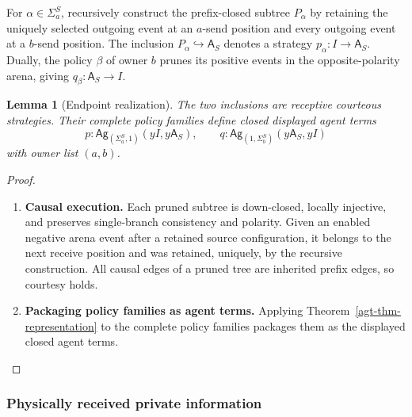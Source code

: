 \documentclass[11pt,a4paper]{article}
\numberwithin{equation}{section}
\newtheorem{lemma}[theorem]{Lemma}
\theoremstyle{definition}
\theoremstyle{remark}
\theoremstyle{plain}
\providecommand{\Ag}{\mathsf{Ag}}
\begin{document}
For $\alpha\in\Sigma_a^S$, recursively construct the prefix-closed
subtree $P_\alpha$ by retaining the uniquely selected outgoing event at
an $a$-send position and every outgoing event at a $b$-send position.
The inclusion $P_\alpha\hookrightarrow\mathsf A_S$ denotes a strategy
$p_\alpha:I\to\mathsf A_S$.  Dually, the policy $\beta$ of owner $b$
prunes its positive events in the opposite-polarity arena, giving
$q_\beta:\mathsf A_S\to I$.

\begin{lemma}[Endpoint realization]
\label{agt-lem-endpoint}
The two inclusions are receptive courteous strategies. Their complete
policy families define closed displayed agent terms
\[
 p:\Ag_{(\Sigma_a^S,1)}(yI,y\mathsf A_S),\qquad
 q:\Ag_{(1,\Sigma_b^S)}(y\mathsf A_S,yI)
\]
with owner list $(a,b)$.
\end{lemma}
\begin{proof}
\leavevmode
\begin{enumerate}[label=\textup{(\arabic*)},leftmargin=*,itemsep=4pt,topsep=3pt]
  \item \textbf{Causal execution.} Each pruned subtree is down-closed, locally injective, and preserves
single-branch consistency and polarity. Given an enabled negative
arena event after a retained source configuration, it belongs to the
next receive position and was retained, uniquely, by the recursive
construction. All causal edges of a pruned tree are inherited prefix
edges, so courtesy holds.
  \item \textbf{Packaging policy families as agent terms.} Applying
Theorem~\ref{agt-thm-representation} to the complete policy families
packages them as the displayed closed agent terms.
\end{enumerate}
\end{proof}

\subsubsection{Physically received private information}
\label{agt-sec-session-input}
\end{document}
